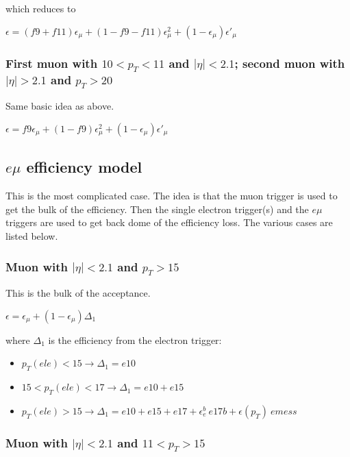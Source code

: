 \noindent which reduces to 

\begin{center}
$\epsilon = (f9+f11)\epsilon_{\mu} + (1-f9-f11)\epsilon_{\mu}^2
+ (1-\epsilon_{\mu})\epsilon'_{\mu}$
\end{center}

\subsubsection{First muon with $10<p_T<11$ and $|\eta|<2.1$;  second muon 
with $|\eta|>2.1$ and $p_T>20$}
Same basic idea as above.

\begin{center}
$\epsilon = f9\epsilon_{\mu} + (1-f9)\epsilon_{\mu}^2
+ (1-\epsilon_{\mu})\epsilon'_{\mu}$
\end{center}

\subsection{$e\mu$ efficiency model}
\label{sec:emumodel}

This is the most complicated case.  The idea is that the muon trigger
is used to get the bulk of the efficiency.  Then the single electron 
trigger(s) and the $e\mu$ triggers are used to get back dome of the 
efficiency loss.  The various cases are listed below.

\subsubsection{Muon with $|\eta|<2.1$ and $p_T>15$}
This is the bulk of the acceptance.

\begin{center}
$\epsilon = \epsilon_{\mu} + (1-\epsilon_{\mu})\Delta_1$ 
\end{center}

where $\Delta_1$ is the efficiency from the electron trigger:
\begin{itemize}
\item $p_T(ele)<15 \to \Delta_1=e10$
\item $15<p_T(ele)<17 \to \Delta_1=e10+e15$
\item $p_T(ele)>15 \to \Delta_1=e10+e15+e17+\epsilon_e^b~e17b+\epsilon(p_T)~emess$
\end{itemize}
 

\subsubsection{Muon with $|\eta|<2.1$ and $11<p_T>15$}

